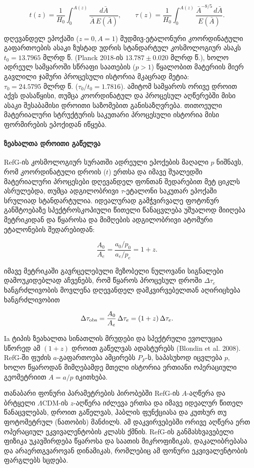 \documentclass[11pt,a4paper]{article}
\begin{document}
\[
t(z) = \frac{1}{H_0}\int_0^{A(z)} \frac{d\bar{A}}{\bar{A}\,E(\bar{A})},
\qquad
\tau(z) = \frac{1}{H_0}\int_0^{A(z)} \frac{\bar{A}^{-8/5}\,d\bar{A}}{E(\bar{A})}.
\]

დღევანდელ ეპოქაში ($z = 0, A = 1$) მუდმივ-ეტალონური კოორდინატული გაფართოების ასაკი ზუსტად უდრის სტანდარტულ კოსმოლოგიურ ასაკს \textbf{$t_0 = 13.7965\text{ მლრდ წ.}$} (Planck 2018-ის $13.787 \pm 0.020\text{ მლრდ წ.}$), ხოლო ადრეულ სამყაროში სწრაფი საათების ($p > 1$) წყალობით მატერიის მიერ გავლილი ჯამური პროცესული ისტორია მკაცრად მეტია: \textbf{$\tau_0 = 24.5795\text{ მლრდ წ.}$} ($\tau_0 / t_0 = 1.7816$). ამიტომ სამყაროს ორივე დროით აქვს დასაწყისი, თუმცა კოორდინატულ და პროცესულ აღწერებში მისი ასაკი შესაბამისი დროითი საზომებით განისაზღვრება. თითოეული მატერიალური სტრუქტურის საკუთარი პროცესული ისტორია მისი ფორმირების ეპოქიდან იწყება.

\paragraph{ზეახალთა დროითი გაწელვა}

RefG-ის კოსმოლოგიურ სურათში ადრეული ეპოქების მაღალი $p$ ნიშნავს, რომ კოორდინატული დროის ($t$) ერთსა და იმავე შუალედში მატერიალური პროცესები დღევანდელ ფონთან შედარებით მეტ ციკლს ასრულებდა, თუმცა ადგილობრივი $\tau$-ეტალონი საკუთარ ეპოქაში სრულიად სტანდარტულია. იდეალურად გამჭვირვალე ფოტონურ განშტოებაზე სპექტროსკოპიული წითელი წანაცვლება უშუალოდ მიიღება მეტრიკიდან და წყაროსა და მიმღების ადგილობრივი ატომური ეტალონების შედარებიდან:

\[
\frac{A_0}{A_e}=\frac{a_0/p_0}{a_e/p_e}=1+z.
\]

იმავე მეტრიკაში გავრცელებული მეზობელი ნულოვანი სიგნალები დამოუკიდებლად აჩვენებს, რომ წყაროს პროცესულ დროში $\Delta\tau_e$ ხანგრძლივობის მოვლენა დღევანდელ დამკვირვებელთან აღირიცხება ხანგრძლივობით

\[
\Delta\tau_{\rm obs}=\frac{A_0}{A_e}\,\Delta\tau_e=(1+z)\,\Delta\tau_e.
\]

Ia ტიპის ზეახალთა სინათლის მრუდები და სპექტრული ევოლუცია სწორედ ამ $(1+z)$ დროით გაწელვას ადასტურებს (Blondin et al. 2008). RefG-ში ფუძის $a$-გაფართოება ამცირებს $P_F$-ს, საპასუხოდ იცვლება $p$, ხოლო წყაროდან მიმღებამდე მთელი ისტორია ერთიანი ოპერაციული გეომეტრიით $A=a/p$ იკითხება.

თანაბარი ფონური პარამეტრების პირობებში RefG-ის $A$-აღწერა და ბრტყელი $\Lambda$CDM-ის $z$-აღწერა იძლევა ერთსა და იმავე იდეალურ წითელ წანაცვლებას, დროით გაწელვას, ჰაბლის ფუნქციასა და კუთხურ თუ ფოტომეტრულ (ნათობის) მანძილს. ამ დაკვირვებებში ორივე აღწერა ერთ ოპერაციულ ეკვივალენტობის კლასს ქმნის. RefG-ის განმასხვავებელი ფიზიკა უკავშირდება წყაროსა და საათის მიკროფიზიკას, დაკალიბრებასა და არაერთგვაროვან დინამიკას, რომლებიც ამ ფონური ეკვივალენტობის ფარგლებს სცდება.
\end{document}

